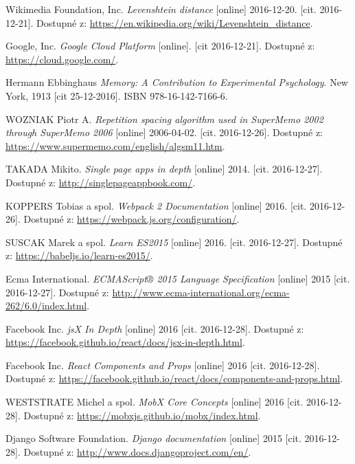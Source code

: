 \documentclass[a4paper,11pt,titlepage,fleqn]{article}
\begin{document}
\begin{thebibliography}{99}
         Wikimedia Foundation, Inc. \textit{Levenshtein distance} [online] 2016-12-20. [cit. 2016-12-21]. Dostupné z: \url{https://en.wikipedia.org/wiki/Levenshtein_distance}.
        
        Google, Inc. \textit{Google Cloud Platform} [online]. [cit 2016-12-21]. Dostupné z: \url{https://cloud.google.com/}.

		Hermann Ebbinghaus \textit{Memory: A Contribution to Experimental Psychology}. New York, 1913 [cit 25-12-2016]. ISBN 978-16-142-7166-6.

        WOZNIAK Piotr A. \textit{Repetition spacing algorithm used in SuperMemo 2002 through SuperMemo 2006} [online] 2006-04-02. [cit. 2016-12-26]. Dostupné z: \url{https://www.supermemo.com/english/algsm11.htm}.

        TAKADA Mikito. \textit{Single page apps in depth} [online] 2014. [cit. 2016-12-27]. Dostupné z: \url{http://singlepageappbook.com/}.

        KOPPERS Tobias a spol. \textit{Webpack 2 Documentation} [online] 2016. [cit. 2016-12-26]. Dostupné z: \url{https://webpack.js.org/configuration/}.

        SUSCAK Marek a spol. \textit{Learn ES2015} [online] 2016. [cit. 2016-12-27]. Dostupné z: \url{https://babeljs.io/learn-es2015/}.
        
        Ecma International. \textit{ECMAScript® 2015 Language Specification} [online] 2015 [cit. 2016-12-27]. Dostupné z: \url{http://www.ecma-international.org/ecma-262/6.0/index.html}.

        Facebook Inc. \textit{\gls{js}X In Depth} [online] 2016 [cit. 2016-12-28]. Dostupné z: \url{https://facebook.github.io/react/docs/jsx-in-depth.html}.

        Facebook Inc. \textit{React Components and Props} [online] 2016 [cit. 2016-12-28]. Dostupné z: \url{https://facebook.github.io/react/docs/components-and-props.html}.
        
        WESTSTRATE Michel a spol. \textit{MobX Core Concepts} [online] 2016 [cit. 2016-12-28].
        Dostupné z: \url{https://mobxjs.github.io/mobx/index.html}.

        Django Software Foundation. \textit{Django documentation} [online] 2015 [cit. 2016-12-28]. Dostupné z: \url{http://www.docs.djangoproject.com/en/}.


\end{thebibliography}
\end{document}
